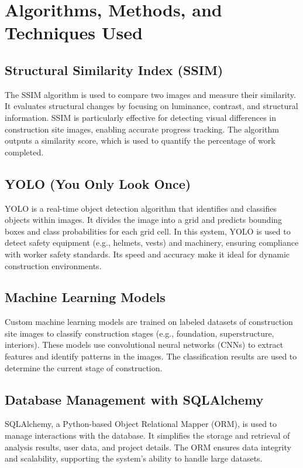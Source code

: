 \documentclass[12pt,a4paper]{report}
\begin{document}

\section{Algorithms, Methods, and Techniques Used}
\subsection{Structural Similarity Index (SSIM)}
The SSIM algorithm is used to compare two images and measure their similarity. It evaluates structural changes by focusing on luminance, contrast, and structural information. SSIM is particularly effective for detecting visual differences in construction site images, enabling accurate progress tracking. The algorithm outputs a similarity score, which is used to quantify the percentage of work completed.

\subsection{YOLO (You Only Look Once)}
YOLO is a real-time object detection algorithm that identifies and classifies objects within images. It divides the image into a grid and predicts bounding boxes and class probabilities for each grid cell. In this system, YOLO is used to detect safety equipment (e.g., helmets, vests) and machinery, ensuring compliance with worker safety standards. Its speed and accuracy make it ideal for dynamic construction environments.

\subsection{Machine Learning Models}
Custom machine learning models are trained on labeled datasets of construction site images to classify construction stages (e.g., foundation, superstructure, interiors). These models use convolutional neural networks (CNNs) to extract features and identify patterns in the images. The classification results are used to determine the current stage of construction.

\subsection{Database Management with SQLAlchemy}
SQLAlchemy, a Python-based Object Relational Mapper (ORM), is used to manage interactions with the database. It simplifies the storage and retrieval of analysis results, user data, and project details. The ORM ensures data integrity and scalability, supporting the system's ability to handle large datasets.
\end{document}
